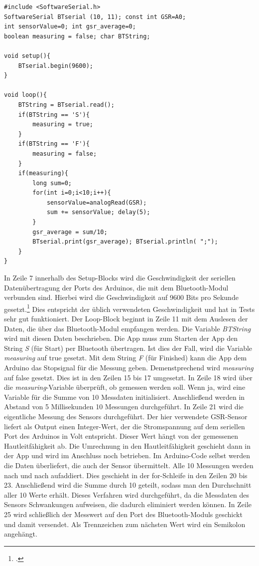 \begin{lstlisting}[caption={Quellcode des Arduinos},style=Arduino]
#include <SoftwareSerial.h>
SoftwareSerial BTserial (10, 11); const int GSR=A0;
int sensorValue=0; int gsr_average=0;
boolean measuring = false; char BTString;

void setup(){
	BTserial.begin(9600);
}

void loop(){
	BTString = BTserial.read();
	if(BTString == 'S'){
		measuring = true;
	}
	if(BTString == 'F'){
		measuring = false;
	}
	if(measuring){
		long sum=0;
		for(int i=0;i<10;i++){ 
			sensorValue=analogRead(GSR);
			sum += sensorValue; delay(5);
		}
		gsr_average = sum/10;
		BTserial.print(gsr_average); BTserial.println( ";");
	}
}
\end{lstlisting}
In Zeile 7 innerhalb des Setup-Blocks wird die Geschwindigkeit der seriellen Datenübertragung der Ports des Arduinos, die mit dem Bluetooth-Modul verbunden sind. Hierbei wird die Geschwindigkeit auf 9600 Bits pro Sekunde gesetzt.\footcite[Vgl.][]{Ard18b} Dies entspricht der üblich verwendeten Geschwindigkeit und hat in Tests sehr gut funktioniert. \newline
Der Loop-Block beginnt in Zeile 11 mit dem Auslesen der Daten, die über das Bluetooth-Modul empfangen werden. Die Variable \textit{BTString} wird mit diesen Daten beschrieben. Die App muss zum Starten der App den String \textit{S} (für Start) per Bluetooth übertragen. Ist dies der Fall, wird die Variable \textit{measuring} auf true gesetzt. Mit dem String \textit{F} (für Finished) kann die App dem Arduino das Stopsignal für die Messung geben. Demenstprechend wird \textit{measuring} auf false gesetzt. Dies ist in den Zeilen 15 bis 17 umgesetzt. \newline
In Zeile 18 wird über die \textit{measuring}-Variable überprüft, ob gemessen werden soll. Wenn ja, wird eine Variable für die Summe von 10 Messdaten initialisiert. Anschließend werden in Abstand von 5 Millisekunden 10 Messungen durchgeführt. In Zeile 21 wird die eigentliche Messung des Sensors durchgeführt. Der hier verwendete GSR-Sensor liefert als Output einen Integer-Wert, der die Stromspannung auf dem seriellen Port des Arduinos in Volt entspricht. Dieser Wert hängt von der gemessenen Hautleitfähigkeit ab. Die Umrechnung in den Hautleitfähigkeit geschieht dann in der App und wird im Anschluss noch betrieben. Im Arduino-Code selbst werden die Daten überliefert, die auch der Sensor übermittelt. Alle 10 Messungen werden nach und nach aufaddiert. Dies geschieht in der for-Schleife in den Zeilen 20 bis 23. Anschließend wird die Summe durch 10 geteilt, sodass man den Durchschnitt aller 10 Werte erhält. Dieses Verfahren wird durchgeführt, da die Messdaten des Sensors Schwankungen aufweisen, die dadurch eliminiert werden können. In Zeile 25 wird schließlich der Messwert auf den Port des Bluetooth-Moduls geschickt und damit versendet. Als Trennzeichen zum nächsten Wert wird ein Semikolon angehängt. \newline
